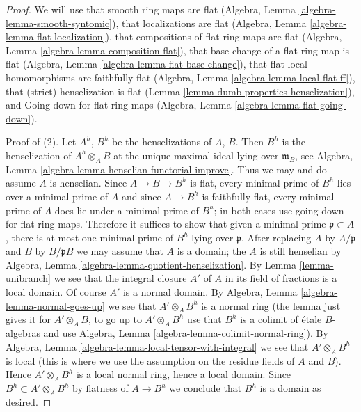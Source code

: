 \documentclass[10pt,a4paper]{amsart}
\theoremstyle{plain}
\theoremstyle{definition}
\theoremstyle{remark}
\numberwithin{equation}{subsection}
\begin{document}
\begin{proof}
We will use that smooth ring maps are flat
(Algebra, Lemma \ref{algebra-lemma-smooth-syntomic}),
that localizations are flat (Algebra, Lemma
\ref{algebra-lemma-flat-localization}),
that compositions of flat ring maps are flat
(Algebra, Lemma \ref{algebra-lemma-composition-flat}),
that base change of a flat ring map is flat
(Algebra, Lemma \ref{algebra-lemma-flat-base-change}),
that flat local homomorphisms are faithfully flat
(Algebra, Lemma \ref{algebra-lemma-local-flat-ff}),
that (strict) henselization is flat
(Lemma \ref{lemma-dumb-properties-henselization}), and
Going down for flat ring maps
(Algebra, Lemma \ref{algebra-lemma-flat-going-down}).

\medskip\noindent
Proof of (2). Let $A^h$, $B^h$ be the henselizations of $A$, $B$. Then $B^h$
is the henselization of $A^h \otimes_A B$ at the unique
maximal ideal lying over $\mathfrak m_B$, see
Algebra, Lemma \ref{algebra-lemma-henselian-functorial-improve}.
Thus we may and do assume $A$ is henselian.
Since $A \to B \to B^h$ is flat, every minimal prime of $B^h$
lies over a minimal prime of $A$ and since $A \to B^h$ is faithfully flat,
every minimal prime of $A$ does lie under a minimal prime of $B^h$;
in both cases use going down for flat ring maps.
Therefore it suffices to show that given a minimal prime
$\mathfrak p \subset A$, there is at most one minimal prime
of $B^h$ lying over $\mathfrak p$.
After replacing $A$ by $A/\mathfrak p$ and $B$ by $B/\mathfrak p B$
we may assume that $A$ is a domain; the $A$ is still henselian by
Algebra, Lemma \ref{algebra-lemma-quotient-henselization}.
By Lemma \ref{lemma-unibranch} we see that the integral closure
$A'$ of $A$ in its field of fractions is a local domain.
Of course $A'$ is a normal domain. By
Algebra, Lemma \ref{algebra-lemma-normal-goes-up}
we see that $A' \otimes_A B^h$ is a normal ring
(the lemma just gives it for $A' \otimes_A B$, to go up to
$A' \otimes_A B^h$ use that $B^h$ is a colimit of \'etale
$B$-algebras and use Algebra, Lemma \ref{algebra-lemma-colimit-normal-ring}).
By Algebra, Lemma \ref{algebra-lemma-local-tensor-with-integral}
we see that $A' \otimes_A B^h$ is local (this is where we
use the assumption on the residue fields of $A$ and $B$).
Hence $A' \otimes_A B^h$ is a local normal ring, hence a local domain.
Since $B^h \subset A' \otimes_A B^h$ by flatness of $A \to B^h$
we conclude that $B^h$ is a domain as desired.


\end{proof}
\end{document}
